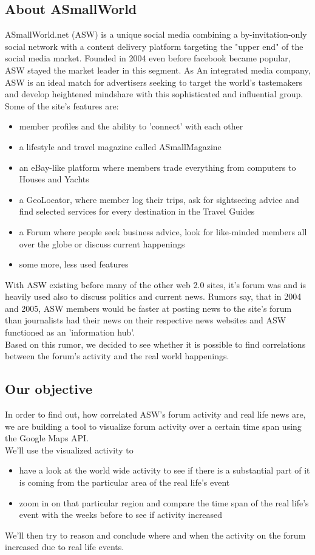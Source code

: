 \documentclass[11pt,a4paper,english]{article}
\begin{document}
		\subsection{About ASmallWorld}
			ASmallWorld.net (ASW) is a unique social media combining a by-invitation-only social network with a content delivery platform targeting the "upper end" of the social media market. Founded in 2004 even before facebook became popular, ASW stayed the market leader in this segment. As An integrated media company, ASW is an ideal match for advertisers seeking to target the world's tastemakers and develop heightened mindshare with this sophisticated and influential group.
			\\Some of the site's features are: \begin{itemize}
				\item member profiles and the ability to 'connect' with each other
				\item a lifestyle and travel magazine called ASmallMagazine
				\item an eBay-like platform where members trade everything from computers to Houses and Yachts
				\item a GeoLocator, where member log their trips, ask for sightseeing advice and find selected services for every destination in the Travel Guides
				\item a Forum where people seek business advice, look for like-minded members all over the globe or discuss current happenings
				\item some more, less used features
			\end{itemize}
			With ASW existing before many of the other web 2.0 sites, it's forum was and is heavily used also to discuss politics and current news. Rumors say, that in 2004 and 2005, ASW members would be faster at posting news to the site's forum than journalists had their news on their respective news websites and ASW functioned as an 'information hub'.
			\\ Based on this rumor, we decided to see whether it is possible to find correlations between the forum's activity and the real world happenings.
			
		\subsection{Our objective}
			In order to find out, how correlated ASW's forum activity and real life news are, we are building a tool to visualize forum activity over a certain time span using the Google Maps API.
			\\ We'll use the visualized activity to \begin{itemize}
				\item have a look at the world wide activity to see if there is a substantial part of it is coming from the particular area of the real life's event
				\item zoom in on that particular region and compare the time span of the real life's event with the weeks before to see if activity increased
			\end{itemize}
			We'll then try to reason and conclude where and when the activity on the forum increased due to real life events.
			
\end{document}
